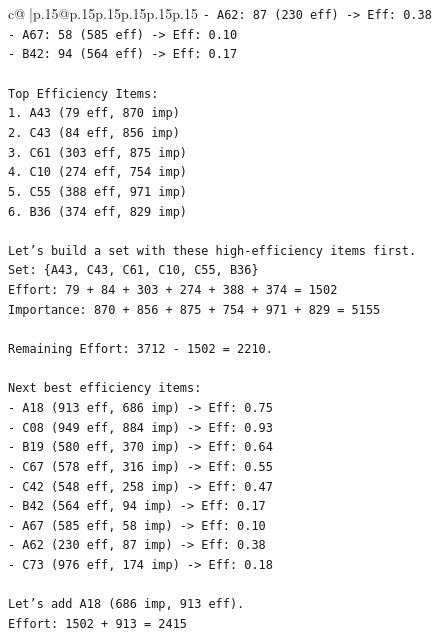\documentclass{article}
\begin{document}
{\begin{supertabular}{c@{$\;$}|p{.15\linewidth}@{}p{.15\linewidth}p{.15\linewidth}p{.15\linewidth}p{.15\linewidth}p{.15\linewidth}}
{{{\texttt{{-} A62: 87 (230 eff) {-}> Eff: 0.38} \\
\texttt{{-} A67: 58 (585 eff) {-}> Eff: 0.10} \\
\texttt{{-} B42: 94 (564 eff) {-}> Eff: 0.17} \\
\\ 
\texttt{Top Efficiency Items:} \\
\texttt{1. A43 (79 eff, 870 imp)} \\
\texttt{2. C43 (84 eff, 856 imp)} \\
\texttt{3. C61 (303 eff, 875 imp)} \\
\texttt{4. C10 (274 eff, 754 imp)} \\
\texttt{5. C55 (388 eff, 971 imp)} \\
\texttt{6. B36 (374 eff, 829 imp)} \\
\\ 
\texttt{Let's build a set with these high{-}efficiency items first.} \\
\texttt{Set: \{A43, C43, C61, C10, C55, B36\}} \\
\texttt{Effort: 79 + 84 + 303 + 274 + 388 + 374 = 1502} \\
\texttt{Importance: 870 + 856 + 875 + 754 + 971 + 829 = 5155} \\
\\ 
\texttt{Remaining Effort: 3712 {-} 1502 = 2210.} \\
\\ 
\texttt{Next best efficiency items:} \\
\texttt{{-} A18 (913 eff, 686 imp) {-}> Eff: 0.75} \\
\texttt{{-} C08 (949 eff, 884 imp) {-}> Eff: 0.93} \\
\texttt{{-} B19 (580 eff, 370 imp) {-}> Eff: 0.64} \\
\texttt{{-} C67 (578 eff, 316 imp) {-}> Eff: 0.55} \\
\texttt{{-} C42 (548 eff, 258 imp) {-}> Eff: 0.47} \\
\texttt{{-} B42 (564 eff, 94 imp) {-}> Eff: 0.17} \\
\texttt{{-} A67 (585 eff, 58 imp) {-}> Eff: 0.10} \\
\texttt{{-} A62 (230 eff, 87 imp) {-}> Eff: 0.38} \\
\texttt{{-} C73 (976 eff, 174 imp) {-}> Eff: 0.18} \\
\\ 
\texttt{Let's add A18 (686 imp, 913 eff).} \\
\texttt{Effort: 1502 + 913 = 2415} \\
}}}
\end{supertabular}}
\end{document}
